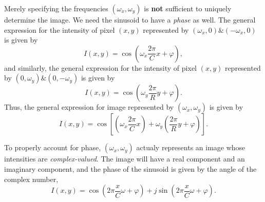 Merely specifying the frequencies $(\omega_x, \omega_y)$ is \textbf{not} sufficient to uniquely determine the image. We need the sinusoid to have a \textit{phase} as well. The general expression for the intensity of pixel $(x, y)$ represented by $(\omega_x, 0) \& (-\omega_x, 0)$ is given by \[
    I(x, y) = \cos \left( \omega_x \frac{2\pi}{C} x + \varphi \right),
\] and similarly, the general expression for the intensity of pixel $(x, y)$ represented by $(0, \omega_y) \& (0, -\omega_y)$ is given by \[
    I(x, y) = \cos \left( \omega_y \frac{2\pi}{R} y + \varphi \right).
\] Thus, the general expression for image represented by $(\omega_x, \omega_y)$ is given by \[
    I(x, y) = \cos \left[ \left( \omega_x \frac{2\pi}{C} x \right) + \omega_y \left( \frac{2\pi}{R} y + \varphi \right) \right].
\]

To properly account for phase, $(\omega_x, \omega_y)$ actualy represents an image whose intensities are \textit{complex-valued}. The image will have a real component and an imaginary component, and the phase of the sinusoid is given by the angle of the complex number, \[
    I(x, y) = \cos(2\pi \frac{x}{C} \omega + \varphi) + j \sin(2\pi \frac{x}{C} \omega + \varphi).
\]